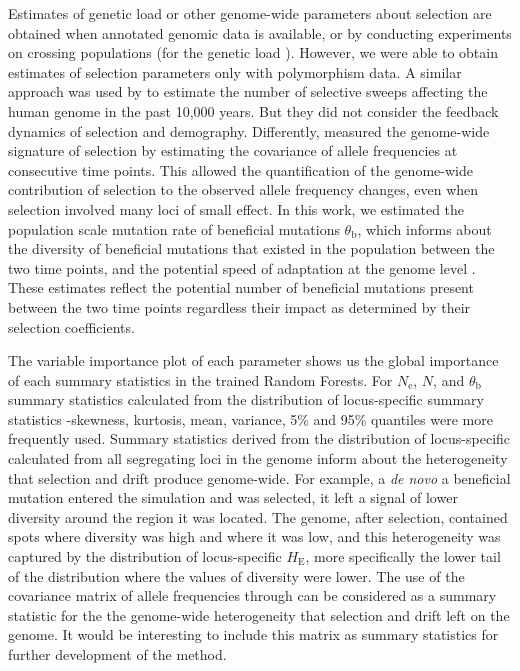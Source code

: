 \documentclass[a4paper, 12pt]{article}
\begin{document}
Estimates of genetic load or other genome-wide parameters about selection are obtained when annotated genomic data is available, \citep{Henn:2015ce} or by conducting experiments on crossing populations (for the genetic load \citet{Plough:2016gw}). However, we were able to obtain estimates of selection parameters only with polymorphism data. A similar approach was used by \citet{Laval:2019jo} to estimate the number of selective sweeps affecting the human genome in the past 10,000 years. But they did not consider the feedback dynamics of selection and demography. Differently, \citet{Buffalo:2020hq} measured the genome-wide signature of selection by estimating the covariance of allele frequencies at consecutive time points. This allowed the quantification of the genome-wide contribution of selection to the observed allele frequency changes, even when selection involved many loci of small effect. In this work, we estimated the population scale mutation rate of beneficial mutations $\theta_{\mathrm{b}}$, which informs about the diversity of beneficial mutations that existed in the population between the two time points, and the potential speed of adaptation at the genome level \citep{Hermisson:2017hw}. These estimates reflect the potential number of beneficial mutations present between the two time points regardless their impact as determined by their selection coefficients.

The variable importance plot of each parameter shows us the global importance of each summary statistics in the trained Random Forests. For $N_{\mathrm{e}}$, $N$, and $\theta_{\mathrm{b}}$ summary statistics calculated from the distribution of locus-specific summary statistics -skewness, kurtosis, mean, variance, 5\% and 95\% quantiles were more frequently used. Summary statistics derived from the distribution of locus-specific calculated from all segregating loci in the genome inform about the heterogeneity that selection and drift produce genome-wide. For example, a \textit{de novo} a beneficial mutation entered the simulation and was selected, it left a signal of lower diversity around the region it was located. The genome, after selection, contained spots where diversity was high and where it was low, and this heterogeneity was captured by the distribution of locus-specific $H_{\mathrm{E}}$, more specifically the lower tail of the distribution where the values of diversity were lower. The use of the covariance matrix of allele frequencies through \citet{Buffalo:2020hq} can be considered as a summary statistic for the the genome-wide heterogeneity that selection and drift left on the genome. It would be interesting to include this matrix as summary statistics for further development of the method.
\end{document}
